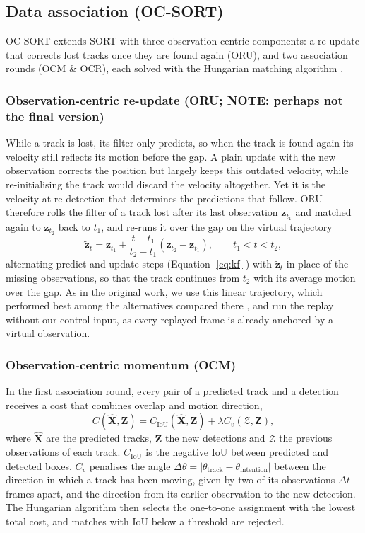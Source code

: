 \documentclass[9pt,twoside]{pnas-new}
\begin{document}
\subsection*{Data association (OC-SORT)}
OC-SORT \cite{ocsort} extends SORT \cite{sort} with three observation-centric components: a re-update that corrects lost tracks once they are found again (ORU), and two association rounds (OCM \& OCR), each solved with the Hungarian matching algorithm \cite{hungarian}.

\subsubsection*{Observation-centric re-update (ORU; NOTE: perhaps not the final version)}
While a track is lost, its filter only predicts, so when the track is found again its velocity still reflects its motion before the gap.
A plain update with the new observation corrects the position but largely keeps this outdated velocity, while re-initialising the track would discard the velocity altogether.
Yet it is the velocity at re-detection that determines the predictions that follow.
ORU therefore rolls the filter of a track lost after its last observation $\mathbf{z}_{t_1}$ and matched again to $\mathbf{z}_{t_2}$ back to $t_1$, and re-runs it over the gap on the virtual trajectory
\begin{equation}
  \tilde{\mathbf{z}}_t = \mathbf{z}_{t_1} + \frac{t - t_1}{t_2 - t_1}(\mathbf{z}_{t_2} - \mathbf{z}_{t_1}), \qquad t_1 < t < t_2,
  \label{eq:oru}
\end{equation}
alternating predict and update steps (Equation [\ref{eq:kf}]) with $\tilde{\mathbf{z}}_t$ in place of the missing observations, so that the track continues from $t_2$ with its average motion over the gap.
As in the original work, we use this linear trajectory, which performed best among the alternatives compared there \cite{ocsort}, and run the replay without our control input, as every replayed frame is already anchored by a virtual observation.

\subsubsection*{Observation-centric momentum (OCM)}
In the first association round, every pair of a predicted track and a detection receives a cost that combines overlap and motion direction,
\begin{equation}
  C(\hat{\mathbf{X}}, \mathbf{Z}) = C_\mathrm{IoU}(\hat{\mathbf{X}}, \mathbf{Z}) + \lambda C_v(\mathcal{Z}, \mathbf{Z}),
  \label{eq:ocm}
\end{equation}
where $\hat{\mathbf{X}}$ are the predicted tracks, $\mathbf{Z}$ the new detections and $\mathcal{Z}$ the previous observations of each track. 
$C_\mathrm{IoU}$ is the negative IoU between predicted and detected boxes. 
$C_v$ penalises the angle $\Delta\theta = |\theta_\mathrm{track} - \theta_\mathrm{intention}|$ between the direction in which a track has been moving, given by two of its observations $\Delta t$ frames apart, and the direction from its earlier observation to the new detection. 
The Hungarian algorithm then selects the one-to-one assignment with the lowest total cost, and matches with IoU below a threshold are rejected.
\end{document}
